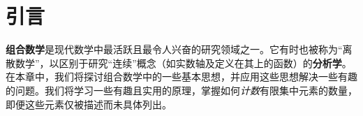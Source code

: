 \section{引言}

\textbf{组合数学}是现代数学中最活跃且最令人兴奋的研究领域之一。它有时也被称为``离散数学''，以区别于研究``连续''概念（如实数轴及定义在其上的函数）的\textbf{分析学}。在本章中，我们将探讨组合数学中的一些基本思想，并应用这些思想解决一些有趣的问题。我们将学习一些有趣且实用的原理，掌握如何\emph{计数}有限集中元素的数量，即便这些元素仅被描述而未具体列出。







